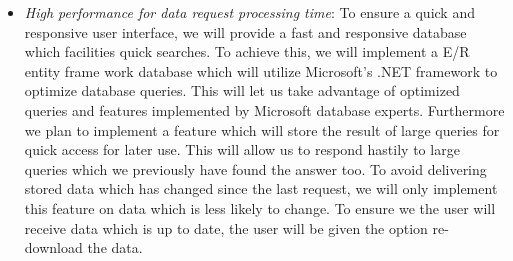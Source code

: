 \begin{itemize}
\item \textit{High performance for data request processing time}: To ensure a quick and responsive user interface, we will provide a fast and responsive database which facilities quick searches. To achieve this, we will implement a E/R entity frame work database which will utilize Microsoft's .NET framework to optimize database queries. This will let us take advantage of optimized queries and features implemented by Microsoft  database experts. Furthermore we plan to implement a feature which will store the result of large queries for quick access for later use. This will allow us to respond hastily to large queries which we previously have found the answer too. To avoid delivering stored data which has changed since the last request, we will only implement this feature on data which is less likely to change. To ensure we the user will receive data which is up to date, the user will be given the option re-download the data. 
\end{itemize}
